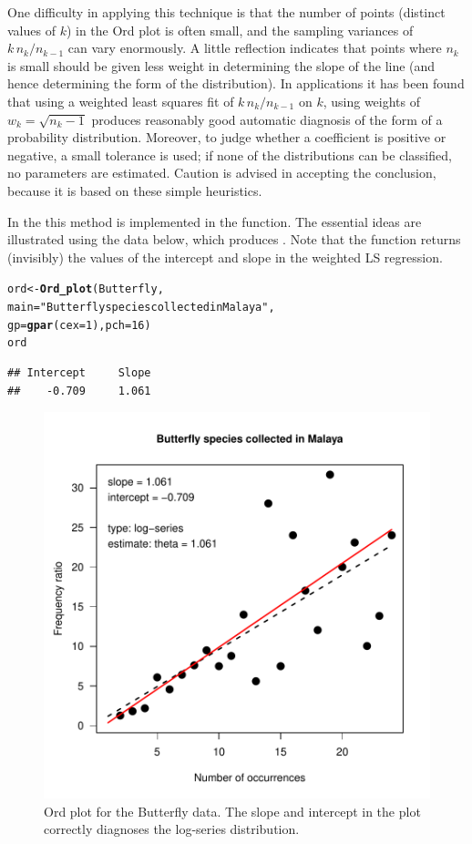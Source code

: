 \documentclass[11pt]{book}\usepackage[]{graphicx}\usepackage[]{color}
\makeatletter
\newcommand{\hlnum}[1]{\textcolor[rgb]{0.686,0.059,0.569}{#1}}%
\newcommand{\hlstr}[1]{\textcolor[rgb]{0.192,0.494,0.8}{#1}}%
\newcommand{\hlstd}[1]{\textcolor[rgb]{0.345,0.345,0.345}{#1}}%
\newcommand{\hlkwb}[1]{\textcolor[rgb]{0.69,0.353,0.396}{#1}}%
\newcommand{\hlkwc}[1]{\textcolor[rgb]{0.333,0.667,0.333}{#1}}%
\newcommand{\hlkwd}[1]{\textcolor[rgb]{0.737,0.353,0.396}{\textbf{#1}}}%
\newenvironment{kframe}{%
 \def\at@end@of@kframe{}%
 \ifinner\ifhmode%
  \def\at@end@of@kframe{\end{minipage}}%
  \begin{minipage}{\columnwidth}%
 \fi\fi%
 \def\FrameCommand##1{\hskip\@totalleftmargin \hskip-\fboxsep
 \colorbox{shadecolor}{##1}\hskip-\fboxsep
     \hskip-\linewidth \hskip-\@totalleftmargin \hskip\columnwidth}%
 \MakeFramed {\advance\hsize-\width
   \@totalleftmargin\z@ \linewidth\hsize
   \@setminipage}}%
 {\par\unskip\endMakeFramed%
 \at@end@of@kframe}
\newenvironment{knitrout}{}{} %
\renewenvironment{knitrout}{\small\renewcommand{\baselinestretch}{.85}}{} %
\makeatother
\begin{document}
One difficulty in applying this technique is that the number of points
(distinct values of $k$)
in the Ord plot is often small, and the sampling variances of
\(k \,  n_k /  n_{k-1}\) can vary enormously.
A little reflection indicates that points where $n_k$ is small
should be given less weight in determining the slope of the
line (and hence determining the form of the distribution).
In applications it has been found that
using a weighted least squares fit of \(k \,
n_k /  n_{k-1}\) on \(k\), using weights of \(w_k = \sqrt { n_k -1
}\)
produces reasonably good
automatic diagnosis of the form of a
probability distribution. Moreover, to judge whether a coefficient is
positive or negative, a small tolerance is used;  if none of the distributions
can be classified, no parameters are estimated.  Caution is advised in
accepting the conclusion, because it is based on these simple heuristics.

In the  this method is implemented in the 
function. The essential ideas are illustrated using the 
 data below, which produces . Note that the
function returns (invisibly) the values of the intercept and slope in the
weighted LS regression.

\begin{knitrout}
\color{fgcolor}\begin{kframe}
\begin{alltt}
\hlstd{ord} \hlkwb{<-} \hlkwd{Ord_plot}\hlstd{(Butterfly,}
                \hlkwc{main} \hlstd{=} \hlstr{"Butterfly species collected in Malaya"}\hlstd{,}
                \hlkwc{gp}\hlstd{=}\hlkwd{gpar}\hlstd{(}\hlkwc{cex}\hlstd{=}\hlnum{1}\hlstd{),} \hlkwc{pch}\hlstd{=}\hlnum{16}\hlstd{)}
\hlstd{ord}
\end{alltt}
\begin{verbatim}
## Intercept     Slope 
##    -0.709     1.061
\end{verbatim}
\end{kframe}\begin{figure}[htbp]


\centerline{\includegraphics[width=.5\textwidth]{ch03/fig/ordplot1} }

\caption[Ord plot for the Butterfly data]{Ord plot for the Butterfly data. The slope and intercept in the plot correctly diagnoses the log-series distribution.\label{fig:ordplot1}}
\end{figure}


\end{knitrout}
\end{document}
